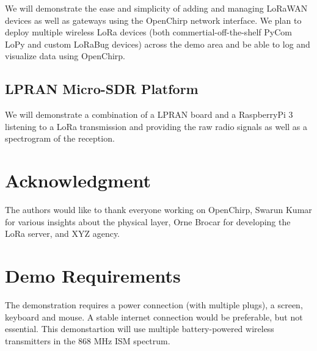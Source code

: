 \documentclass[conference]{IEEEtran}
\begin{document}
We will demonstrate the ease and simplicity of adding and managing LoRaWAN
devices as well as gateways using the OpenChirp network interface. We plan to
deploy multiple wireless LoRa devices (both commertial-off-the-shelf PyCom
LoPy and custom LoRaBug devices) across the demo area and be able to log and
visualize data using OpenChirp.


\subsection{LPRAN Micro-SDR Platform}
\label{sec:lpran-demo}

We will demonstrate a combination of a LPRAN board and a RaspberryPi 3
listening to a LoRa transmission and providing the raw radio signals as well
as a spectrogram of the reception.

\section*{Acknowledgment}

The authors would like to thank everyone working on OpenChirp, Swarun Kumar
for various insights about the physical layer, Orne Brocar for developing the
LoRa server, and {\color{red} XYZ} agency.

\balance


\section{Demo Requirements}
\label{sec:requirements}

The demonstration requires a power connection (with multiple plugs), a screen,
keyboard and mouse. A stable internet connection would be preferable, but not
essential. This demonstartion will use multiple battery-powered wireless
transmitters in the 868 MHz ISM spectrum.
\end{document}
